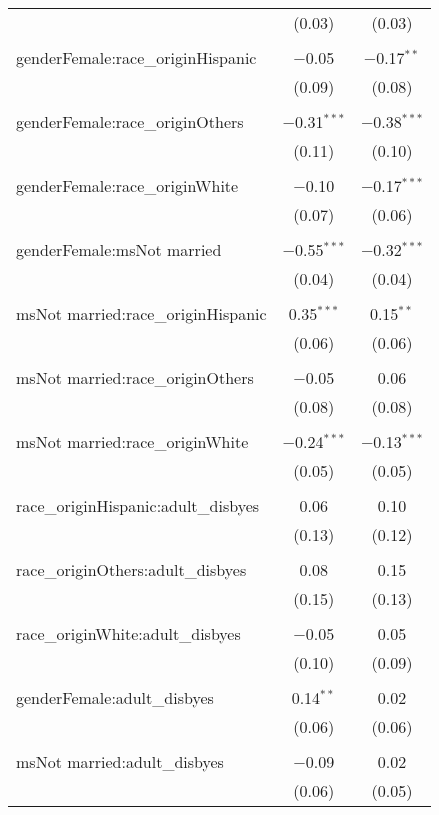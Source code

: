 \documentclass[11pt]{extarticle} %
\begin{document}
\begin{table}[!htbp]
\begin{tabular}{@{\extracolsep{5pt}}lcc}
  & (0.03) & (0.03) \\ 
  & & \\ 
 genderFemale:race\_originHispanic & $-$0.05 & $-$0.17$^{**}$ \\ 
  & (0.09) & (0.08) \\ 
  & & \\ 
 genderFemale:race\_originOthers & $-$0.31$^{***}$ & $-$0.38$^{***}$ \\ 
  & (0.11) & (0.10) \\ 
  & & \\ 
 genderFemale:race\_originWhite & $-$0.10 & $-$0.17$^{***}$ \\ 
  & (0.07) & (0.06) \\ 
  & & \\ 
 genderFemale:msNot married & $-$0.55$^{***}$ & $-$0.32$^{***}$ \\ 
  & (0.04) & (0.04) \\ 
  & & \\ 
 msNot married:race\_originHispanic & 0.35$^{***}$ & 0.15$^{**}$ \\ 
  & (0.06) & (0.06) \\ 
  & & \\ 
 msNot married:race\_originOthers & $-$0.05 & 0.06 \\ 
  & (0.08) & (0.08) \\ 
  & & \\ 
 msNot married:race\_originWhite & $-$0.24$^{***}$ & $-$0.13$^{***}$ \\ 
  & (0.05) & (0.05) \\ 
  & & \\ 
 race\_originHispanic:adult\_disbyes & 0.06 & 0.10 \\ 
  & (0.13) & (0.12) \\ 
  & & \\ 
 race\_originOthers:adult\_disbyes & 0.08 & 0.15 \\ 
  & (0.15) & (0.13) \\ 
  & & \\ 
 race\_originWhite:adult\_disbyes & $-$0.05 & 0.05 \\ 
  & (0.10) & (0.09) \\ 
  & & \\ 
 genderFemale:adult\_disbyes & 0.14$^{**}$ & 0.02 \\ 
  & (0.06) & (0.06) \\ 
  & & \\ 
 msNot married:adult\_disbyes & $-$0.09 & 0.02 \\ 
  & (0.06) & (0.05) \\ 

\end{tabular}
\end{table}
\end{document}
